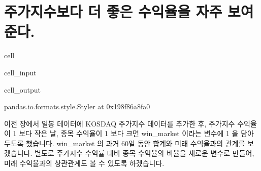\documentclass[letterpaper,10pt,english]{jupyterBook}
\begin{document}
\section{주가지수보다 더 좋은 수익율을 자주 보여준다.}
\label{\detokenize{chapter5/5.1.5_Hypothesis_5:id1}}\label{\detokenize{chapter5/5.1.5_Hypothesis_5::doc}}
\begin{sphinxuseclass}{cell}\begin{sphinxVerbatimInput}

\begin{sphinxuseclass}{cell_input}
\begin{sphinxVerbatim}[commandchars=\\\{\}]
  
\end{sphinxVerbatim}

\end{sphinxuseclass}\end{sphinxVerbatimInput}
\begin{sphinxVerbatimOutput}

\begin{sphinxuseclass}{cell_output}
\begin{sphinxVerbatim}[commandchars=\\\{\}]
\PYGZlt{}pandas.io.formats.style.Styler at 0x198f86a8fa0\PYGZgt{}
\end{sphinxVerbatim}

\end{sphinxuseclass}\end{sphinxVerbatimOutput}

\end{sphinxuseclass}
\sphinxAtStartPar
 이전 장에서 일봉 데이터에 KOSDAQ 주가지수 데이터를 추가한 후, 주가지수 수익율이 1 보다 작은 날, 종목 수익율이 1 보다 크면 win\_market 이라는 변수에 1 을 담아 두도록 했습니다. win\_market 의 과거 60일 동안 합계와 미래 수익율과의 관계를 보겠습니다. 별도로 주가지수 수익률 대비 종목 수익율의 비율을 새로운 변수로 만들어, 미래 수익율과의 상관관계도 볼 수 있도록 하겠습니다.
\end{document}
